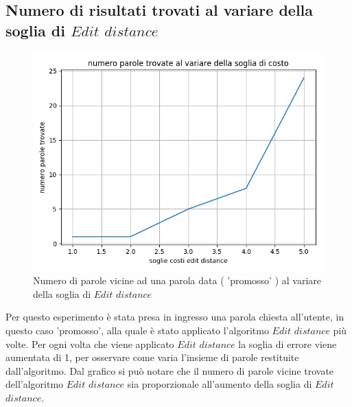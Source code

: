 \documentclass[a4paper,12pt]{article}
\begin{document}
\subsection{Numero di risultati trovati al variare della soglia di $Edit$ $distance$}
\begin{figure}[h]
    \centering
    \captionsetup{justification=centering,margin=1.05cm}
    \includegraphics[width=1.0\textwidth]{Figure_3_2}
    \caption{Numero di parole vicine ad una parola data ( 'promosso' ) al variare della soglia di $Edit$ $distance$}
    \label{fig:test3_1}
\end{figure}
Per questo esperimento è stata presa in ingresso una parola chiesta all'utente, in questo caso 'promosso', alla quale è stato applicato l'algoritmo $Edit$ $distance$ più volte.
\newline
\newline
Per ogni volta che viene applicato $Edit$ $distance$ la soglia di errore viene aumentata di 1, per osservare come varia l'insieme di parole restituite dall'algoritmo.
\newline
\newline
Dal grafico si può notare che il numero di parole vicine trovate dell'algoritmo $Edit$ $distance$ sia proporzionale all'aumento della soglia di $Edit$ $distance$.
\newline
\newline

\clearpage
\end{document}
